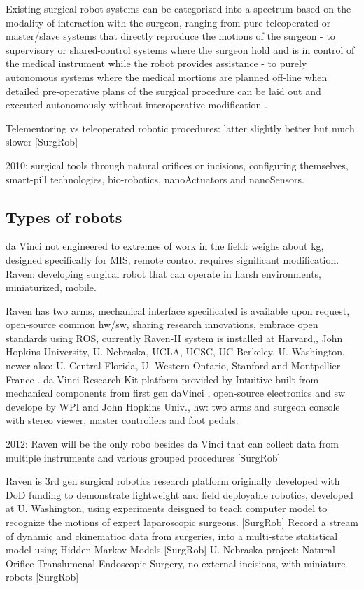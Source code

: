 Existing surgical robot systems can be categorized into a spectrum based on the modality of interaction with the surgeon, ranging from pure teleoperated or master/slave systems that directly reproduce the motions of the surgeon - to supervisory or shared-control systems where the surgeon hold and is in control of the medical instrument while the robot provides assistance - to purely autonomous systems where the medical mortions are planned off-line when detailed pre-operative plans of the surgical procedure can be laid out and executed autonomously without interoperative modification \citep{bib:raven_debride}.

Telementoring vs teleoperated robotic procedures: latter slightly better but much slower [SurgRob]

2010: surgical tools through natural orifices or incisions, configuring themselves, smart-pill technologies, bio-robotics, nanoActuators and nanoSensors.

\subsection{Types of robots}
da Vinci not engineered to extremes of work in the field: weighs about  kg, designed specifically for MIS, remote control requires significant modification.
Raven: developing surgical robot that can operate in harsh environments, miniaturized, mobile.


Raven has two arms, mechanical interface specificated is available upon request, open-source common hw/sw, sharing research innovations, embrace open standards \citep{bib:raven_ii} using ROS, currently Raven-II system is installed at Harvard,, John Hopkins University, U. Nebraska, UCLA, UCSC, UC Berkeley, U. Washington, newer also: U. Central Florida, U. Western Ontario, Stanford and Montpellier France \citep{bib:raven_ii}.
da Vinci Research Kit platform provided by Intuitive built from mechanical components from first gen daVinci \citep{bib:raven_observ}, open-source electronics and sw develope by WPI and John Hopkins Univ., hw: two arms and surgeon console with stereo viewer, master controllers and foot pedals.

2012: Raven will be the only robo besides da Vinci that can collect data from multiple instruments and various grouped procedures [SurgRob]

Raven is 3rd gen surgical robotics research platform originally developed with DoD funding to demonstrate lightweight and field deployable robotics, developed at U. Washington, using experiments deisgned to teach  computer model to recognize the motions of expert laparoscopic surgeons. [SurgRob] Record a stream of dynamic and ckinematioc data from surgeries, into a multi-state statistical model using Hidden Markov Models [SurgRob]
U. Nebraska project: Natural Orifice Translumenal Endoscopic Surgery, no external incisions, with miniature robots [SurgRob]

